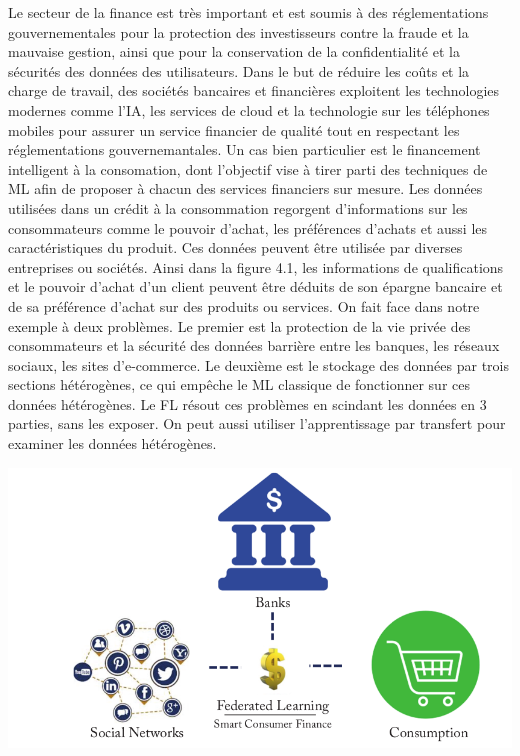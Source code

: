 \documentclass[12pt,a4paper,french]{report}
\begin{document}
Le secteur de la finance est très important et est soumis à des réglementations gouvernementales pour la protection des investisseurs contre la fraude et la mauvaise gestion, ainsi que pour la conservation de la confidentialité et la sécurités des données des utilisateurs. Dans le but de réduire les coûts et la charge de travail, des sociétés bancaires et financières exploitent les technologies modernes comme l'IA, les services de cloud et la technologie sur les téléphones mobiles pour assurer un service financier de qualité tout en respectant les réglementations gouvernemantales. Un cas bien particulier est le financement intelligent à la consomation, dont l'objectif vise à tirer parti des techniques de ML afin de proposer à chacun des services financiers sur mesure. Les données utilisées dans un crédit à la consommation regorgent d'informations sur les consommateurs comme le pouvoir d'achat, les préférences d'achats et aussi les caractéristiques du produit. Ces données peuvent être utilisée par diverses entreprises ou sociétés. Ainsi dans la figure 4.1, les informations de qualifications et le pouvoir d'achat d'un client peuvent être déduits de son épargne bancaire et de sa préférence d'achat sur des produits ou services. On fait face dans notre exemple à deux problèmes. Le premier est la protection de la vie privée des consommateurs et la sécurité des données barrière entre les banques, les réseaux sociaux, les sites d'e-commerce. Le deuxième est le stockage des données par trois sections hétérogènes, ce qui empêche le ML classique de fonctionner sur ces données hétérogènes. Le FL résout ces problèmes en scindant les données en 3 parties, sans les exposer. On peut aussi utiliser l'apprentissage par transfert pour examiner les données hétérogènes.

\begin{center}
	\includegraphics[scale=0.3]{finances}
	\label{fig1}
\end{center}
\end{document}
